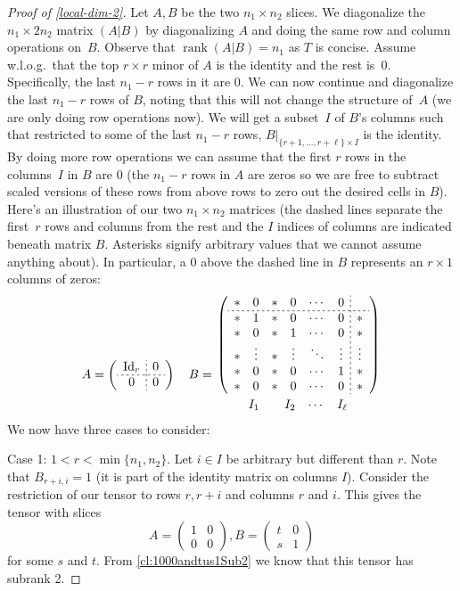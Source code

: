 \documentclass{daj}
\DeclareMathOperator{\rank}{rank} \DeclareMathOperator{\col}{colspan}
\newcommand{\id}{\mathrm{Id}}
\begin{document}
%
\begin{proof}[Proof of \autoref{local-dim-2}]
    Let $A,B$ be the two $n_1\times n_2$ slices. We diagonalize the $n_1\times 2n_2$ matrix $(A|B)$ by diagonalizing $A$ and doing the same row and column operations on~$B$. Observe that $\rank(A|B)=n_1$ as $T$ is concise. 
    Assume w.l.o.g.\ that the top $r\times r$ minor of $A$ is the identity and the rest is~$0$. Specifically, the last $n_1-r$ rows in it are $0$. %
%
    We can now continue and diagonalize the last $n_1-r$ rows of $B$, noting that this will not change the structure of~$A$ (we are only doing row operations now).
    We will get a subset~$I$ of $B$'s columns such that restricted to some of the last $n_1-r$ rows, $B|_{\{r+1,\dots,r+\ell\}\times I}$ is the identity. 
    By doing more row operations we can assume that the first $r$ rows in the columns~$I$ in $B$ are $0$ (the $n_1-r$ rows in $A$ are zeros so we are free to subtract scaled versions of these rows from above rows to zero out the desired cells in $B$). Here's an illustration of our two $n_1\times n_2$ matrices (the dashed lines separate the first~$r$ rows and columns from the rest and the $I$ indices of columns are indicated beneath matrix $B$. Asterisks signify arbitrary values that we cannot assume anything about). In particular, a $0$ above the dashed line in $B$ represents an $r\times 1$ columns of zeros:
    \[
   A=\left(
   \begin{array}{c;{2pt/2pt}c}
       \id_r & 0 \\ \hdashline[2pt/2pt]
       0 & 0
   \end{array}
   \right) \quad
   B=\genfrac{}{}{0pt}{}{\left(
   \begin{array}{cccccc;{2pt/2pt}c}
        *&0&*&0&\cdots & 0& \\ \hdashline[2pt/2pt]
        *&1&*&0&\cdots&0&*\\
        *&0&*&1&\cdots&0&*\\
        *&\vdots&*&\vdots&\ddots&\vdots&\vdots\\
        *&0&*&0&\cdots&1&*\\
        *&0&*&0&\cdots&0&*
   \end{array}
   \right)}{ \begin{array}{ccccccc}
        &I_1&&I_2&\cdots&I_\ell&\hspace{1pt}  
   \end{array}}%
    \]
%
    We now have three cases to consider:

%
    Case 1: $1<r<\min\{n_1,n_2\}$.
    Let $i\in I$ be arbitrary but different than $r$.
    Note that $B_{r+i,i}=1$ (it is part of the identity matrix on columns $I$). 
    Consider the restriction of our tensor to rows $r,r+i$ and columns $r$ and $i$. 
    This gives the tensor with slices
    \[
    A = \begin{pmatrix}1 & 0\\ 0 & 0\end{pmatrix},
    B=\begin{pmatrix}t & 0\\ s & 1\end{pmatrix}
    \]
    for some $s$ and $t$. From \autoref{cl:1000andtus1Sub2} we know that this tensor has subrank 2.


\end{proof}
\end{document}
